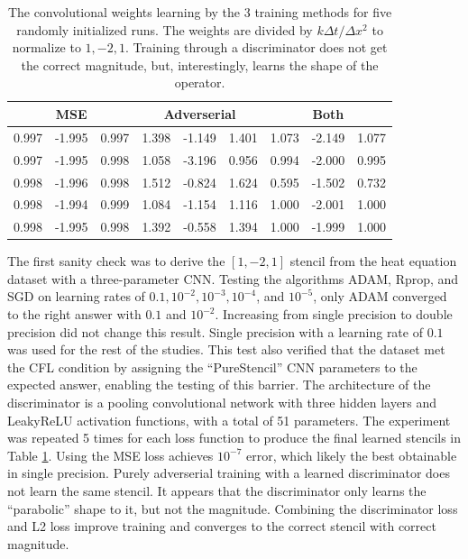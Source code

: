 \documentclass{article}
\begin{document}

\begin{table}
  \caption{\label{tab:conv}The convolutional weights learning by the 3 training
    methods for five randomly initialized runs. The weights are
    divided by $k \Delta t / \Delta x^2$ to normalize to
    $1,-2,1$. Training through a discriminator does not get the
    correct magnitude, but, interestingly, learns the shape of the operator.}
  \centering
  \begin{tabular}{rrr|rrr|rrr}
    \hline
    \multicolumn{3}{c}{MSE} & \multicolumn{3}{c}{Adverserial}  &\multicolumn{3}{c}{Both} \\
\hline
 0.997 & -1.995 & 0.997 & 1.398 & -1.149 & 1.401 & 1.073 & -2.149 & 1.077 \\
 0.997 & -1.995 & 0.998 & 1.058 & -3.196 & 0.956 & 0.994 & -2.000 & 0.995 \\
 0.998 & -1.996 & 0.998 & 1.512 & -0.824 & 1.624 & 0.595 & -1.502 & 0.732 \\
 0.998 & -1.994 & 0.999 & 1.084 & -1.154 & 1.116 & 1.000 & -2.001 & 1.000 \\
 0.998 & -1.995 & 0.998 & 1.392 & -0.558 & 1.394 & 1.000 & -1.999 & 1.000 \\
\hline
\end{tabular}
\end{table}




The first sanity check was to derive the $[1,-2,1]$ stencil from the heat equation dataset with a three-parameter CNN.
Testing the algorithms ADAM, Rprop, and SGD on learning rates of $0.1, 10^{-2}, 10^{-3}, 10^{-4}$, and $10^{-5}$, only ADAM converged to the right answer with $0.1$ and $10^{-2}$. Increasing from single precision to double precision did not change this result. Single precision with a learning rate of $0.1$ was used for the rest of the studies.
This test also verified that the dataset met the CFL condition by
assigning the ``PureStencil'' CNN parameters to the expected answer,
enabling the testing of this barrier.
The architecture of the discriminator is a pooling convolutional
network with three hidden layers and LeakyReLU activation functions, with a total of 51 parameters.
The experiment was repeated 5
times for each loss function to produce the final learned stencils in
Table \ref{tab:conv}.
Using the MSE loss achieves $10^{-7}$ error, which likely the best obtainable in single precision.
Purely adverserial training with a learned discriminator does not learn the same stencil. It appears that the discriminator only learns the ``parabolic'' shape to it, but not the magnitude. Combining the discriminator loss and L2 loss improve training and converges to the correct stencil with correct magnitude.
\end{document}
